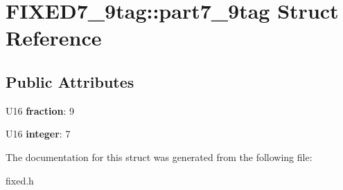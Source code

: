 \hypertarget{struct_f_i_x_e_d7__9tag_1_1part7__9tag}{
\section{FIXED7\_\-9tag::part7\_\-9tag Struct Reference}
\label{struct_f_i_x_e_d7__9tag_1_1part7__9tag}
}
\subsection*{Public Attributes}
\begin{DoxyCompactItemize}
\item 
\hypertarget{struct_f_i_x_e_d7__9tag_1_1part7__9tag_a25bcfa19da1002258d475f18b53e397b}{
U16 {\bfseries fraction}: 9}
\label{struct_f_i_x_e_d7__9tag_1_1part7__9tag_a25bcfa19da1002258d475f18b53e397b}

\item 
\hypertarget{struct_f_i_x_e_d7__9tag_1_1part7__9tag_af69bce800f405384be4d97c06484aee2}{
U16 {\bfseries integer}: 7}
\label{struct_f_i_x_e_d7__9tag_1_1part7__9tag_af69bce800f405384be4d97c06484aee2}

\end{DoxyCompactItemize}


The documentation for this struct was generated from the following file:\begin{DoxyCompactItemize}
\item 
fixed.h\end{DoxyCompactItemize}
